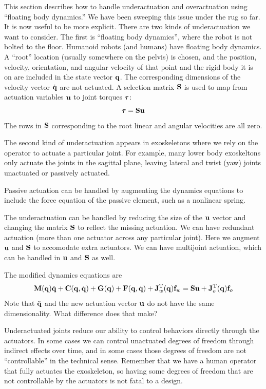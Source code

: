 \documentclass[letterpaper,12pt,fullpage]{article}
\begin{document}
This section describes how to handle underactuation and overactuation using
``floating body dynamics.''
We have been sweeping this
issue under the rug so far. It is now useful to be more explicit.
There are two kinds of underactuation we want to consider. The first
is ``floating body dynamics'', where the robot is not bolted to the floor.
Humanoid robots (and humans) have floating body dynamics.
A ``root'' location (usually somewhere
on the pelvis) is chosen, and the position, velocity, orientation, and angular
velocity of that point and the rigid body it is on
are included in the state vector ${\bf q}$. The corresponding dimensions of the
velocity vector $\dot{{\bf q}}$ are not actuated. A selection matrix
${\bf S}$ is used to map from actuation variables ${\bf u}$ to joint torques $\vtau$:
\begin{equation}
\vtau = \mS \vu
\end{equation}
The rows in ${\bf S}$ corresponding to the root linear and angular velocities
are all zero.

The second kind of underactuation appears in exoskeletons where we rely on the
operator to actuate a particular joint. For example, many lower body
exoskeltons only actuate the joints in the sagittal plane, leaving lateral
and twist (yaw) joints unactuated or passively actuated. 

Passive actuation can be handled by augmenting the
dynamics equations to include the force equation of the passive element,
such as a nonlinear spring.

The underactuation can be handled by reducing the size of the ${\bf u}$ vector
and changing the matrix ${\bf S}$ to reflect the missing actuation.
We can have redundant actuation (more than one actuator across any particular
joint). Here we augment ${\bf u}$ and ${\bf S}$ to accomodate extra actuators.
We can have multijoint actuation, which can be handled in ${\bf u}$ and ${\bf S}$ as well.

The modified dynamics equations are
\begin{equation}
{\bf M}({\bf q}) \ddot{{\bf q}} + {\bf C}({\bf q},\dot{{\bf q}}) + {\bf G}({\bf q}) + {\bf F}({\bf q},\dot{{\bf q}})
+ {\bf J}_w^{{\rm T}}({\bf q}) {\bf f}_w = {\bf S} {\bf u} + {\bf J}_o^{{\rm T}}({\bf q}) {\bf f}_o
\label{eq:dynamics2}
\end{equation}
Note that $\ddot{{\bf q}}$ and the new actuation vector ${\bf u}$
do not have the same dimensionality. What difference does that make?

Underactuated joints reduce our ability to control behaviors directly
through the actuators. In some cases we can control unactuated degrees of freedom
through indirect effects over time, and in some cases those degrees of freedom
are not ``controllable'' in the technical sense. Remember that we have a human
operator that fully actuates the exoskeleton, so having some degrees of freedom
that are not controllable by the actuators is not fatal to a design.
\end{document}
